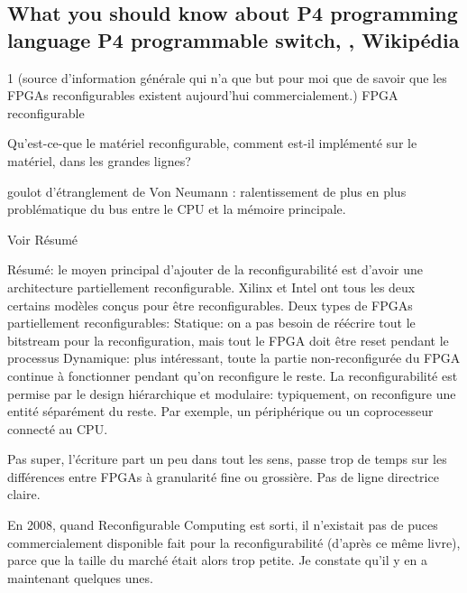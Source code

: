 
\subsection{What you should know about P4 programming language P4 programmable switch, \cite{noauthor_reconfigurable_2022}, Wikipédia}
 1 (source d'information générale qui n'a que but pour moi que de savoir que les FPGAs reconfigurables existent aujourd'hui commercialement.)
 FPGA reconfigurable

 Qu'est-ce-que le matériel reconfigurable, comment est-il implémenté sur le matériel, dans les grandes lignes?

 goulot d'étranglement de Von Neumann \cite{noauthor_von_nodate}: ralentissement de plus en plus problématique du bus entre le CPU et la mémoire principale.

 Voir Résumé

 Résumé: le moyen principal d’ajouter de la reconfigurabilité est d’avoir une architecture partiellement reconfigurable. Xilinx et Intel ont tous les deux certains modèles conçus pour être reconfigurables. Deux types de FPGAs partiellement reconfigurables:
Statique: on a pas besoin de réécrire tout le bitstream pour la reconfiguration, mais tout le FPGA doit être reset pendant le processus
Dynamique: plus intéressant, toute la partie non-reconfigurée du FPGA continue à fonctionner pendant qu’on reconfigure le reste.
La reconfigurabilité est permise par le design hiérarchique et modulaire: typiquement, on reconfigure une entité séparément du reste. Par exemple, un périphérique ou un coprocesseur connecté au CPU.

 Pas super, l’écriture part un peu dans tout les sens, passe trop de temps sur les différences entre FPGAs à granularité fine ou grossière. Pas de ligne directrice claire.

En 2008, quand Reconfigurable Computing \cite{hauck_introduction_2008} est sorti, il n'existait pas de puces commercialement disponible fait pour la reconfigurabilité (d'après ce même livre), parce que la taille du marché était alors trop petite. Je constate qu'il y en a maintenant quelques unes.

\clearpage
